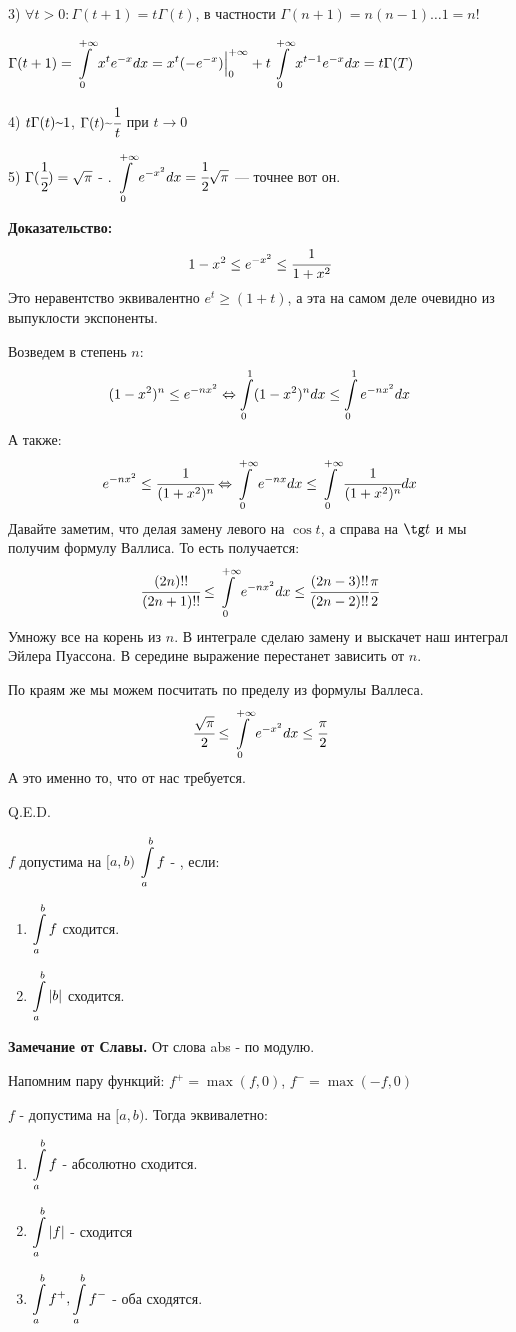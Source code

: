 3) $\forall t >0: \Gamma(t+1) = t \Gamma(t)$, в частности $\Gamma(n+1) = n (n-1) \ldots 1 = n!$

$\Gamma(t+1) = \displaystyle\int\limits_{0}^{+\infty}x^t e^{-x} dx = x^t (-e^{-x})\Big|^{+\infty}_{0} + t \displaystyle\int\limits_{0}^{+\infty}x^{t-1}e^{-x} dx= t\Gamma(T)$

4) $t \Gamma(t) \mytilde 1$, $\Gamma(t) \mytilde \cfrac{1}{t}$ при $t\rightarrow 0 $

5) $\Gamma(\cfrac{1}{2}) = \sqrt{\pi}$ - . $\displaystyle\int\limits_{0}^{+\infty}e^{-x^2}dx = \cfrac{1}{2}\sqrt{\pi}$ --- точнее вот он.

\textbf{Доказательство:}
$$1-x^2\leq e^{-x^2}\leq \cfrac{1}{1+x^2}$$
Это неравентство эквивалентно $e^t \geq (1+t)$, а эта на самом деле очевидно из выпуклости экспоненты.

Возведем в степень $n$:
$$(1-x^2)^n \leq e^{-nx^2} \Leftrightarrow \displaystyle\int\limits_{0}^{1}(1-x^2)^n dx \leq \displaystyle\int\limits_{0}^{1}e^{-nx^2}dx$$
А также:
$$e^{-nx^2} \leq \cfrac{1}{(1+x^2)^n} \Leftrightarrow \displaystyle\int\limits_{0}^{+\infty}e^{-nx}dx\leq \displaystyle\int\limits_{0}^{+\infty}\cfrac{1}{(1+x^2)^n}dx$$
Давайте заметим, что  делая замену левого на $\cos t$, а справа на $\tg t$ и мы получим формулу Валлиса. То есть получается:
$$\cfrac{(2n)!!}{(2n+1)!!}\leq \displaystyle\int\limits_{0}^{+\infty} e^{-nx^2}dx \leq \cfrac{(2n-3)!!}{(2n-2)!!}\cfrac{\pi}{2}$$
Умножу все на корень из $n$. В интеграле сделаю замену и выскачет наш интеграл Эйлера Пуассона. В середине выражение перестанет зависить от $n$.

По краям же мы можем посчитать по пределу из формулы Валлеса. 
$$\cfrac{\sqrt{\pi}}{2} \leq \displaystyle\int\limits_{0}^{+\infty}e^{-x^2}dx \leq \cfrac{\pi}{2}$$
А это именно то, что от нас требуется.

\hfill Q.E.D.

 $f$ допустима на $[a,b)$
$\displaystyle\int\limits_{a}^{b}f$ - , если:
\begin{enumerate}
    \item $\displaystyle\int\limits_{a}^{b}f$ сходится.
    \item $\displaystyle\int\limits_{a}^{b} |b|$ сходится.
\end{enumerate}

\textbf{Замечание от Славы.} От слова abs - по модулю.

Напомним пару функций: $f^+ =\max (f,0)$, $f^{-} = \max(-f,0)$


$f$ - допустима на $[a,b)$. Тогда эквивалетно:

\begin{enumerate}
    \item $\displaystyle\int\limits_{a}^{b}f$ - абсолютно сходится.
    \item $\displaystyle\int\limits_{a}^{b}|f|$ - сходится
    \item $\displaystyle\int\limits_{a}^{b} f^+, \displaystyle\int\limits_{a}^{b} f^{-}$ - оба сходятся.
\end{enumerate}

